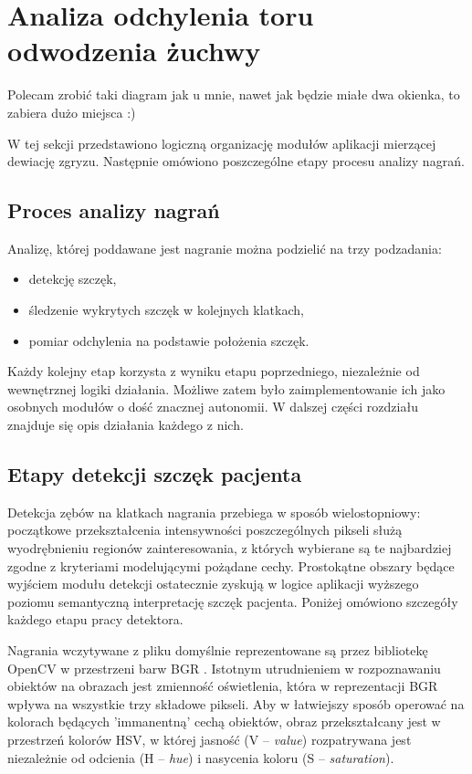 \section{Analiza odchylenia toru odwodzenia żuchwy}
Polecam zrobić taki diagram jak u mnie, nawet jak będzie miałe dwa okienka, to zabiera dużo miejsca :)

W tej sekcji przedstawiono logiczną organizację modułów aplikacji mierzącej dewiację zgryzu. Następnie omówiono poszczególne etapy procesu analizy nagrań.

\subsection{Proces analizy nagrań}

Analizę, której poddawane jest nagranie można podzielić na trzy podzadania:
\begin{itemize}
    \item detekcję szczęk,
    \item śledzenie wykrytych szczęk w kolejnych klatkach,
    \item pomiar odchylenia na podstawie położenia szczęk.
\end{itemize}
Każdy kolejny etap korzysta z wyniku etapu poprzedniego, niezależnie od wewnętrznej logiki działania. Możliwe zatem było zaimplementowanie ich jako osobnych modułów o dość znacznej autonomii. W dalszej części rozdziału znajduje się opis działania każdego z nich.

\subsection{Etapy detekcji szczęk pacjenta}

Detekcja zębów na klatkach nagrania przebiega w sposób wielostopniowy: początkowe przekształcenia intensywności poszczególnych pikseli służą wyodrębnieniu regionów zainteresowania, z których wybierane są te najbardziej zgodne z kryteriami modelującymi pożądane cechy. Prostokątne obszary będące wyjściem modułu detekcji ostatecznie zyskują w logice aplikacji wyższego poziomu semantyczną interpretację  szczęk pacjenta. Poniżej omówiono szczegóły każdego etapu pracy detektora.

Nagrania wczytywane z pliku domyślnie reprezentowane są przez bibliotekę OpenCV w przestrzeni barw BGR \cite{opencv_colors}. Istotnym utrudnieniem w rozpoznawaniu obiektów na obrazach jest zmienność oświetlenia, która w reprezentacji BGR wpływa na wszystkie trzy składowe pikseli. Aby w łatwiejszy sposób operować na kolorach będących 'immanentną' cechą obiektów, obraz przekształcany jest w przestrzeń kolorów HSV, w której jasność (V -- \emph{value}) rozpatrywana jest niezależnie od odcienia (H -- \emph{hue}) i nasycenia koloru (S -- \emph{saturation}).  

